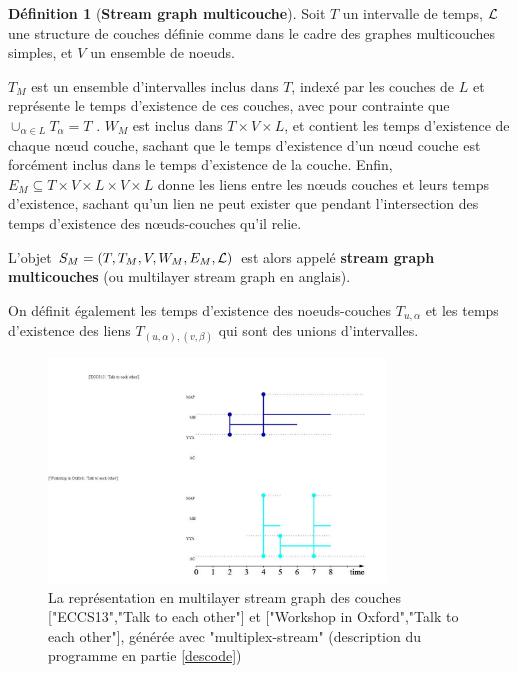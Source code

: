 \documentclass[11pt,a4paper]{article}
\theoremstyle{definition}
\newtheorem{defn}{Définition}
\theoremstyle{remark}
\theoremstyle{remark}
\begin{document}
\begin{defn}[\textbf{Stream graph multicouche}]
    
    Soit $T$ un intervalle de temps, ${\cal L}$ une structure de couches définie comme dans le cadre des graphes multicouches simples, et $V$ un ensemble de noeuds. 
    
    $T_M$ est un ensemble d'intervalles inclus dans $T$, indexé par les couches de $L$ et représente le temps d'existence de ces couches, avec pour contrainte que $\cup_{\alpha \in L} T_{\alpha} = T$ . $W_M$ est inclus dans $T \times V \times L$, et contient les temps d'existence de chaque nœud couche, sachant que le temps d'existence d'un nœud couche est forcément inclus dans le temps d'existence de la couche. Enfin, $E_M \subseteq T \times V \times L \times V \times L$ donne les liens entre les nœuds couches et leurs temps d'existence, sachant qu'un lien ne peut exister que pendant l'intersection des temps d'existence des nœuds-couches qu'il relie.
    
    L'objet $S_M = (T,T_M,V,W_M,E_M,{\cal L})$ est alors appelé \textbf{stream graph multicouches } (ou multilayer stream graph en anglais).
    
    On définit également les temps d'existence des noeuds-couches $T_{u,\alpha}$ et les temps d'existence des liens $T_{(u,\alpha),(v,\beta)}$ qui sont des unions d'intervalles.
	\end{defn}
	
	\begin{figure}[H]
		\centering
		\includegraphics[width=0.8\textwidth]{exMultiStream.JPG}
		\caption{La représentation en multilayer stream graph des couches ["ECCS13","Talk to each other"] et ["Workshop in Oxford","Talk to each other"], générée avec "multiplex-stream" (description du programme en partie \ref{descode})}
	\end{figure}
	
\end{document}
